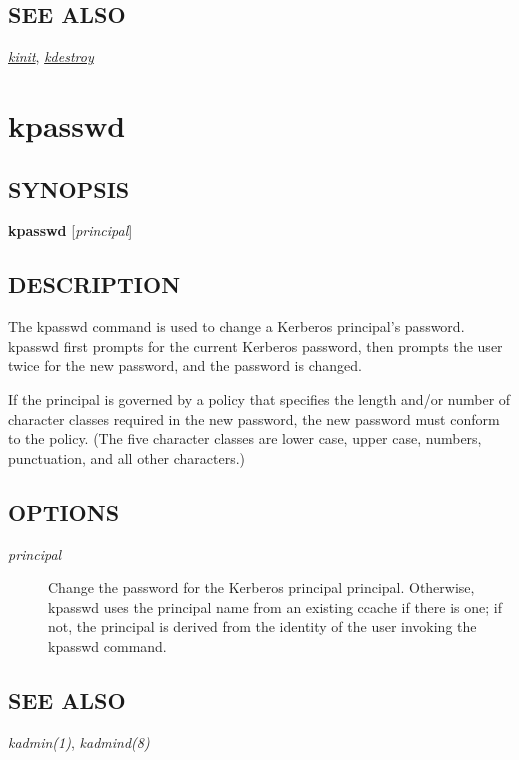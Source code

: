 \documentclass[letterpaper,10pt,english]{sphinxmanual}
\begin{document}
\subsection{SEE ALSO}
\label{user/user_commands/klist:see-also}
{\hyperref[user/user_commands/kinit:kinit-1]{\emph{kinit}}}, {\hyperref[user/user_commands/kdestroy:kdestroy-1]{\emph{kdestroy}}}


\section{kpasswd}
\label{user/user_commands/kpasswd:kpasswd}\label{user/user_commands/kpasswd::doc}\label{user/user_commands/kpasswd:kpasswd-1}

\subsection{SYNOPSIS}
\label{user/user_commands/kpasswd:synopsis}
\textbf{kpasswd} {[}\emph{principal}{]}


\subsection{DESCRIPTION}
\label{user/user_commands/kpasswd:description}
The kpasswd command is used to change a Kerberos principal's password.
kpasswd first prompts for the current Kerberos password, then prompts
the user twice for the new password, and the password is changed.

If the principal is governed by a policy that specifies the length
and/or number of character classes required in the new password, the
new password must conform to the policy.  (The five character classes
are lower case, upper case, numbers, punctuation, and all other
characters.)


\subsection{OPTIONS}
\label{user/user_commands/kpasswd:options}\begin{description}
\item[{\emph{principal}}] \leavevmode
Change the password for the Kerberos principal principal.
Otherwise, kpasswd uses the principal name from an existing ccache
if there is one; if not, the principal is derived from the
identity of the user invoking the kpasswd command.

\end{description}


\subsection{SEE ALSO}
\label{user/user_commands/kpasswd:see-also}
\emph{kadmin(1)}, \emph{kadmind(8)}
\end{document}

